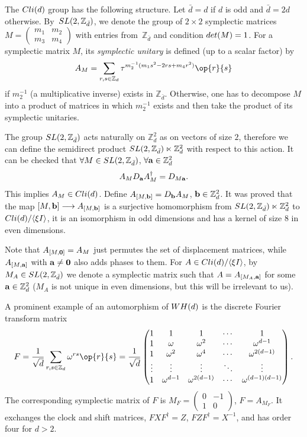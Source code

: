 \documentclass[11pt]{article}
\numberwithin{equation}{section}
\numberwithin{equation}{section}
\newcommand{\la}{\langle}
\newcommand{\ra}{\rangle}
\newcommand{\mbb}{\mathbb}
\newcommand{\bmp}{\begin{pmatrix}}
\newcommand{\emp}{\end{pmatrix}}
\begin{document}
The ${\rm Cli}(d)$ group has the following structure.
Let $\bar{d} = d$ if $d$ is odd and $\bar{d} = 2d$ otherwise.
By~${\rm SL}(2, \mbb{Z}_{\bar{d}} )$, we denote the group of $2 \times 2$ symplectic matrices
$M = \left(\begin{smallmatrix} m_1 & m_2 \\ m_3 & m_4 \end{smallmatrix}\right)$ with
entries from~$\mbb{Z}_{\bar{d}}$ and condition ${\rm det}(M) = 1$.
For a symplectic matrix $M$,
its \textit{symplectic unitary} is defined (up to a scalar factor) by
\[
A_M = \sum_{r,s \in \mbb{Z}_d}\tau^{m_2^{-1}(m_1 s^2 -2rs + m_4 r^2)} \op{r}{s}
\]
if $m_2^{-1}$ (a multiplicative inverse) exists in $\mbb{Z}_{\bar{d}}$. Otherwise,
one has to decompose $M$ into a product of matrices in which $m_2^{-1}$ exists
and then take the product of its symplectic unitaries.

The group ${\rm SL}(2, \mbb{Z}_{\bar{d}} )$ acts naturally on $\mbb{Z}_d^2$ as
on vectors of size $2$, therefore we can define
the semidirect product ${\rm SL}(2, \mbb{Z}_{\bar{d}}) \ltimes \mbb{Z}_d^2$ with respect to this action.
It can be checked that $\forall M \in {\rm SL}(2, \mbb{Z}_{\bar{d}})$, $\forall {\bf a} \in \mbb{Z}_d^2$
\[
A_M D_{\bf a} A_M^\dag = D_{M{\bf a}}.
\]
This implies $A_M \in {\rm Cli}(d)$.
Define $A_{[M, {\bf b}]} = D_{{\bf b}} A_M$, ${\bf b} \in \mbb{Z}_d^2$.
It was proved \cite[Theorem 1]{Appleby} that the map
$[M, {\bf b}] \longrightarrow A_{[M, {\bf b}]}$
is a surjective homomorphism from
${\rm SL}(2, \mbb{Z}_{\bar{d}}) \ltimes \mbb{Z}_d^2$ to ${\rm Cli}(d) / \la \xi I \ra$,
it is an isomorphism in odd dimensions and has a kernel of size $8$ in even dimensions.

Note that $A_{[M, {\bf 0}]} = A_M$ just permutes the set of displacement matrices,
while $A_{[M, {\bf a}]}$ with ${\bf a} \neq {\bf 0}$ also adds phases to them.
For $A \in {\rm Cli}(d)/ \la \xi I \ra$, by
$M_A \in {\rm SL}(2, \mbb{Z}_{\bar{d}})$ we denote
a symplectic matrix such that $A = A_{[M_A, {\bf a}]}$
for some ${\bf a} \in \mbb{Z}_d^2$ ($M_A$ is not unique in even dimensions,
but this will be irrelevant to us).

A prominent example of an automorphism of ${\rm WH}(d)$ is the discrete Fourier transform matrix
\[
F = \frac{1}{\sqrt{d}}\sum_{r,s \in \mbb{Z}_d}\omega^{rs} \op{r}{s} = \frac{1}{\sqrt{d}}\bmp
1 & 1 & 1 & \cdots & 1\\
1 & \omega & \omega^2 & \cdots & \omega^{d-1}\\
1 & \omega^2 & \omega^4 & \cdots & \omega^{2(d-1)}\\
\vdots & \vdots & \vdots & \ddots & \vdots\\
1 & \omega^{d-1} & \omega^{2(d-1)} & \cdots & \omega^{(d-1)(d-1)}\\
\emp.
\]
The corresponding symplectic matrix of $F$ is
$M_F = \left(\begin{smallmatrix} 0 & -1 \\ 1 & 0 \end{smallmatrix}\right)$, $F = A_{M_F}$.
It exchanges the clock and shift matrices,
$FXF^\dag = Z$, $FZF^\dag = X^{-1}$, and has order four for $d>2$.
\end{document}
